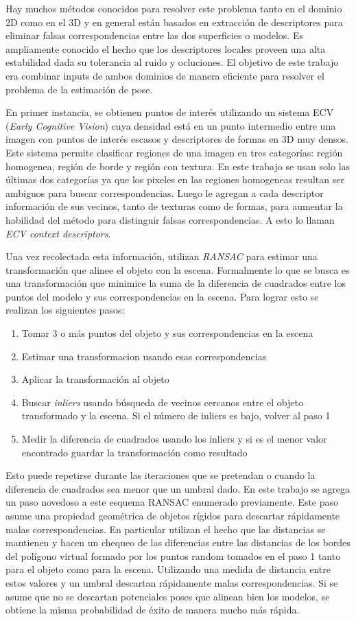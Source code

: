 Hay muchos métodos conocidos para resolver este problema tanto en el dominio 2D como en el 3D y en general están basados en extracción de descriptores para eliminar falsas correspondencias entre las dos superficies o modelos. Es ampliamente conocido el hecho que los descriptores locales proveen una alta estabilidad dada su tolerancia al ruido y ocluciones. El objetivo de este trabajo era combinar inputs de ambos dominios de manera eficiente para resolver el problema de la estimación de pose.

En primer instancia, se obtienen puntos de interés utilizando un sistema ECV (\textit{Early Cognitive Vision}) cuya densidad está en un punto intermedio entre una imagen con puntos de interés escasos y descriptores de formas en 3D muy densos. Este sistema permite clasificar regiones de una imagen en tres categorías: región homogenea, región de borde y región con textura. En este trabajo se usan solo las últimas dos categorías ya que los pixeles en las regiones homogeneas resultan ser ambiguos para buscar correspondencias. Luego le agregan a cada descriptor información de sus vecinos, tanto de texturas como de formas, para aumentar la habilidad del método para distinguir falsas correspondencias. A esto lo llaman \textit{ECV context descriptors}.

Una vez recolectada esta información, utilizan \textit{RANSAC} para estimar una transformación que alinee el objeto con la escena. Formalmente lo que se busca es una transformación que minimice la suma de la diferencia de cuadrados entre los puntos del modelo y sus correspondencias en la escena. Para lograr esto se realizan los siguientes pasos:
\begin{enumerate}
	\item Tomar 3 o más puntos del objeto y sus correspondencias en la escena
	\item Estimar una transformacion usando esas correspondencias
	\item Aplicar la transformación al objeto
	\item Buscar \textit{inliers} usando búsqueda de vecinos cercanos entre el objeto transformado y la escena. Si el número de inliers es bajo, volver al paso 1
	\item Medir la diferencia de cuadrados usando los inliers y si es el menor valor encontrado guardar la transformación como resultado
\end{enumerate}

Esto puede repetirse durante las iteraciones que se pretendan o cuando la diferencia de cuadrados sea menor que un umbral dado. En este trabajo se agrega un paso novedoso a este esquema RANSAC enumerado previamente. Este paso asume una propiedad geométrica de objetos rígidos para descartar rápidamente malas correspondencias. En particular utilizan el hecho que las distancias se mantienen y hacen un chequeo de las diferencias entre las distancias de los bordes del polígono virtual formado por los puntos random tomados en el paso 1 tanto para el objeto como para la escena. Utilizando una medida de distancia entre estos valores y un umbral descartan rápidamente malas correspondencias. Si se asume que no se descartan potenciales poses que alinean bien los modelos, se obtiene la misma probabilidad de éxito de manera mucho más rápida.


